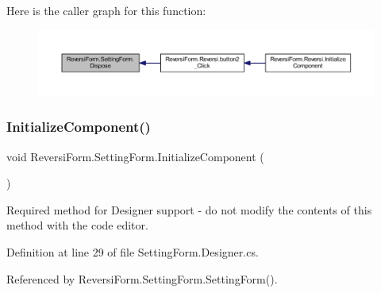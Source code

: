 Here is the caller graph for this function\+:
\nopagebreak
\begin{figure}[H]
\begin{center}
\leavevmode
\includegraphics[width=350pt]{class_reversi_form_1_1_setting_form_ab4be09946d93ed193820f8d7acfc2cb5_icgraph}
\end{center}
\end{figure}
\mbox{\label{class_reversi_form_1_1_setting_form_a9b663029f37a28044ff2300fc66dc859}} 
\subsubsection{\texorpdfstring{Initialize\+Component()}{InitializeComponent()}}
{\footnotesize\ttfamily void Reversi\+Form.\+Setting\+Form.\+Initialize\+Component (\begin{DoxyParamCaption}{ }\end{DoxyParamCaption})\hspace{0.3cm}{\ttfamily [private]}}



Required method for Designer support -\/ do not modify the contents of this method with the code editor. 



Definition at line 29 of file Setting\+Form.\+Designer.\+cs.



Referenced by Reversi\+Form.\+Setting\+Form.\+Setting\+Form().

